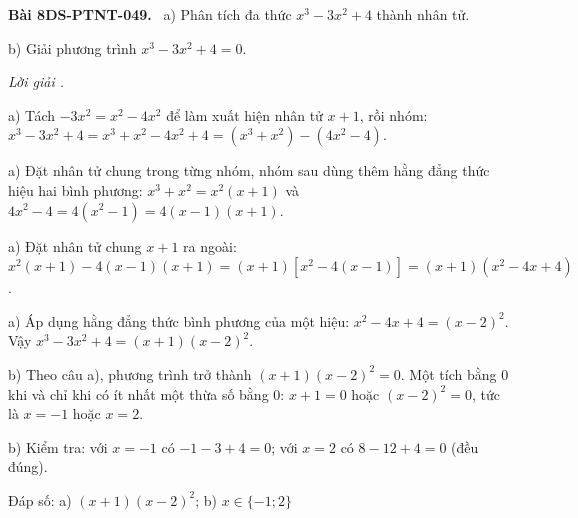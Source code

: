 \documentclass[12pt,a4paper]{article}
\newenvironment{problem}[1][]{\par\medskip\noindent\textbf{Bài #1.}\ }{\par}
\newenvironment{solution}[1][]{\par\noindent\textit{Lời giải #1.}\par}{\par}
\begin{document}
\begin{problem}[8DS-PTNT-049]
a) Phân tích đa thức $x^3 - 3x^2 + 4$ thành nhân tử.

b) Giải phương trình $x^3 - 3x^2 + 4 = 0$.

\begin{solution}
a) Tách $-3x^2 = x^2 - 4x^2$ để làm xuất hiện nhân tử $x + 1$, rồi nhóm: $x^3 - 3x^2 + 4 = x^3 + x^2 - 4x^2 + 4 = (x^3 + x^2) - (4x^2 - 4)$.

a) Đặt nhân tử chung trong từng nhóm, nhóm sau dùng thêm hằng đẳng thức hiệu hai bình phương: $x^3 + x^2 = x^2(x + 1)$ và $4x^2 - 4 = 4(x^2 - 1) = 4(x - 1)(x + 1)$.

a) Đặt nhân tử chung $x + 1$ ra ngoài: $x^2(x + 1) - 4(x - 1)(x + 1) = (x + 1)\left[x^2 - 4(x - 1)\right] = (x + 1)(x^2 - 4x + 4)$.

a) Áp dụng hằng đẳng thức bình phương của một hiệu: $x^2 - 4x + 4 = (x - 2)^2$. Vậy $x^3 - 3x^2 + 4 = (x + 1)(x - 2)^2$.

b) Theo câu a), phương trình trở thành $(x + 1)(x - 2)^2 = 0$. Một tích bằng $0$ khi và chỉ khi có ít nhất một thừa số bằng $0$: $x + 1 = 0$ hoặc $(x - 2)^2 = 0$, tức là $x = -1$ hoặc $x = 2$.

b) Kiểm tra: với $x = -1$ có $-1 - 3 + 4 = 0$; với $x = 2$ có $8 - 12 + 4 = 0$ (đều đúng).

Đáp số: a) $\boxed{(x + 1)(x - 2)^2}$; b) $\boxed{x \in \{-1; 2\}}$
\end{solution}
\end{problem}
\end{document}
